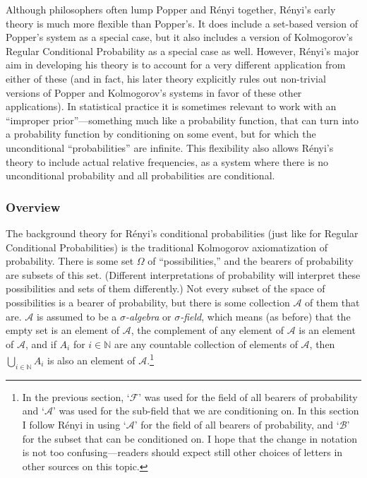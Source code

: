 Although philosophers often lump Popper and R\'{e}nyi together, R\'{e}nyi's early theory is much more flexible than Popper's. It does include a set-based version of Popper's system as a special case, but it also includes a version of Kolmogorov's Regular Conditional Probability as a special case as well. However, R\'{e}nyi's major aim in developing his theory is to account for a very different application from either of these (and in fact, his later theory explicitly rules out non-trivial versions of Popper and Kolmogorov's systems in favor of these other applications). In statistical practice it is sometimes relevant to work with an ``improper prior''---something much like a probability function, that can turn into a probability function by conditioning on some event, but for which the unconditional ``probabilities'' are infinite. This flexibility also allows R\'{e}nyi's theory to include actual relative frequencies, as a system where there is no unconditional probability and all probabilities are conditional.

\subsubsection{Overview}

The background theory for R\'{e}nyi's conditional probabilities (just like for Regular Conditional Probabilities) is the traditional Kolmogorov axiomatization of probability. There is some set $\Omega$ of ``possibilities,'' and the bearers of probability are subsets of this set. (Different interpretations of probability will interpret these possibilities and sets of them differently.) Not every subset of the space of possibilities is a bearer of probability, but there is some collection $\mathcal{A}$ of them that are. $\mathcal{A}$ is assumed to be a \textit{$\sigma$-algebra} or \textit{$\sigma$-field}, which means (as before) that the empty set is an element of $\mathcal{A}$, the complement of any element of $\mathcal{A}$ is an element of $\mathcal{A}$, and if $A_i$ for $i\in\mathbb{N}$ are any countable collection of elements of $\mathcal{A}$, then $\bigcup_{i\in\mathbb{N}}A_i$ is also an element of $\mathcal{A}$.\footnote{In the previous section, `$\mathcal{F}$' was used for the field of all bearers of probability and `$\mathcal{A}$' was used for the sub-field that we are conditioning on. In this section I follow R\'{e}nyi in using `$\mathcal{A}$' for the field of all bearers of probability, and `$\mathcal{B}$' for the subset that can be conditioned on. I hope that the change in notation is not too confusing---readers should expect still other choices of letters in other sources on this topic.}

